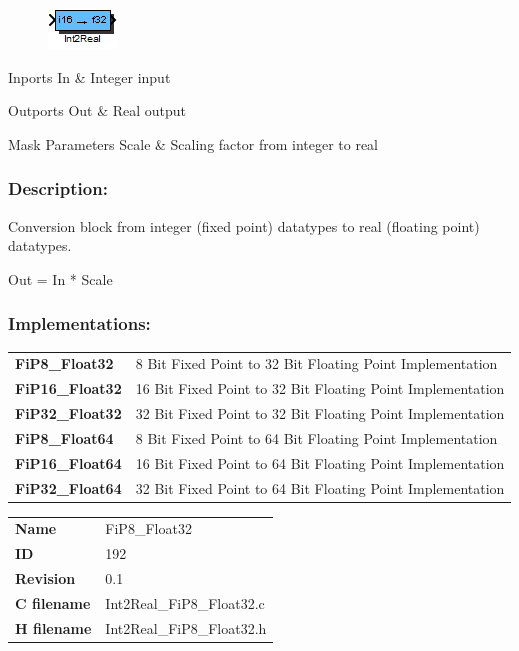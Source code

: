 \label{block:Int2Real}
\begin{figure}[H]\includegraphics{Int2Real}\end{figure} 

\begin{XtoCtabular}{Inports}
In & Integer input\tabularnewline
\hline
\end{XtoCtabular}


\begin{XtoCtabular}{Outports}
Out & Real output\tabularnewline
\hline
\end{XtoCtabular}

\begin{XtoCtabular}{Mask Parameters}
Scale & Scaling factor from integer to real\tabularnewline
\hline
\end{XtoCtabular}

\subsubsection*{Description:}
Conversion block from integer (fixed point) datatypes to real (floating point) datatypes.

  Out = In * Scale 


\subsubsection*{Implementations:}
\begin{tabular}{l l}
\textbf{FiP8\_Float32} & 8 Bit Fixed Point to 32 Bit Floating Point Implementation\tabularnewline
\textbf{FiP16\_Float32} & 16 Bit Fixed Point to 32 Bit Floating Point Implementation\tabularnewline
\textbf{FiP32\_Float32} & 32 Bit Fixed Point to 32 Bit Floating Point Implementation\tabularnewline
\textbf{FiP8\_Float64} & 8 Bit Fixed Point to 64 Bit Floating Point Implementation\tabularnewline
\textbf{FiP16\_Float64} & 16 Bit Fixed Point to 64 Bit Floating Point Implementation\tabularnewline
\textbf{FiP32\_Float64} & 32 Bit Fixed Point to 64 Bit Floating Point Implementation\tabularnewline
\end{tabular}

\nopagebreak[0]
\begin{tabular}{l l}
\textbf{Name} & FiP8\_Float32 \tabularnewline
\textbf{ID} & 192 \tabularnewline
\textbf{Revision} & 0.1 \tabularnewline
\textbf{C filename} & Int2Real\_FiP8\_Float32.c \tabularnewline
\textbf{H filename} & Int2Real\_FiP8\_Float32.h \tabularnewline
\end{tabular}
\vspace{1ex}


